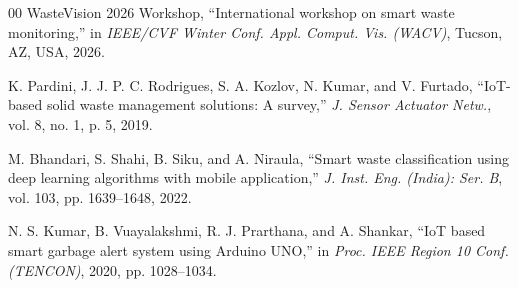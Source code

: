 \documentclass[conference]{IEEEtran}
\begin{document}
\begin{thebibliography}{00}
WasteVision 2026 Workshop, ``International workshop on smart waste monitoring,'' in \textit{IEEE/CVF Winter Conf. Appl. Comput. Vis. (WACV)}, Tucson, AZ, USA, 2026.

K. Pardini, J. J. P. C. Rodrigues, S. A. Kozlov, N. Kumar, and V. Furtado, ``IoT-based solid waste management solutions: A survey,'' \textit{J. Sensor Actuator Netw.}, vol. 8, no. 1, p. 5, 2019.

M. Bhandari, S. Shahi, B. Siku, and A. Niraula, ``Smart waste classification using deep learning algorithms with mobile application,'' \textit{J. Inst. Eng. (India): Ser. B}, vol. 103, pp. 1639--1648, 2022.

N. S. Kumar, B. Vuayalakshmi, R. J. Prarthana, and A. Shankar, ``IoT based smart garbage alert system using Arduino UNO,'' in \textit{Proc. IEEE Region 10 Conf. (TENCON)}, 2020, pp. 1028--1034.

\end{thebibliography}
\end{document}
